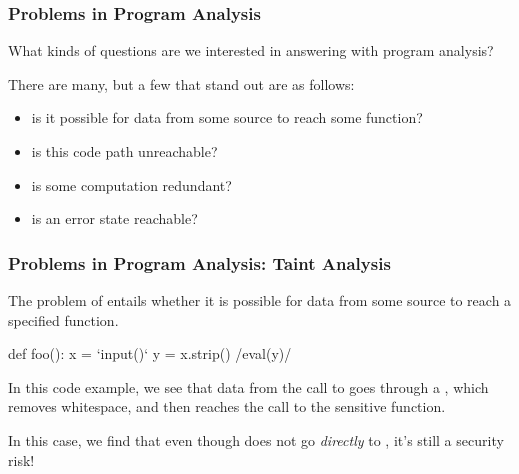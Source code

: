 \documentclass[aspectratio=169, handout]{beamer}
\begin{document}

 \begin{frame}[fragile]
   \frametitle{Problems in Program Analysis}

   What kinds of questions are we interested in answering with program analysis?

   \pause
   \vspace{\fill}

   There are many, but a few that stand out are as follows:

   \pause
   \begin{itemize}
    \item is it possible for data from some source to reach some function? \pause
    \item is this code path unreachable? \pause
    \item is some computation redundant? \pause
    \item is an error state reachable?
   \end{itemize}
\end{frame}

 \begin{frame}[fragile]
   \frametitle{Problems in Program Analysis: Taint Analysis}

   The problem of  entails whether it is possible for data
   from some source to reach a specified function.

   \pause
   \vspace{\fill}

   \begin{pythoncodeblock}
      def foo():
        x = `input()`
        y = x.strip()
        /eval(y)/
   \end{pythoncodeblock}

   In this code example, we see that data from the call to 
   goes through a , which removes whitespace, and then reaches
   the call to the sensitive  function.

   \pause
   \vspace{\fill}

   In this case, we find that even though  does not go
   \textit{directly} to , it's still a security risk!
 \end{frame}
\end{document}
